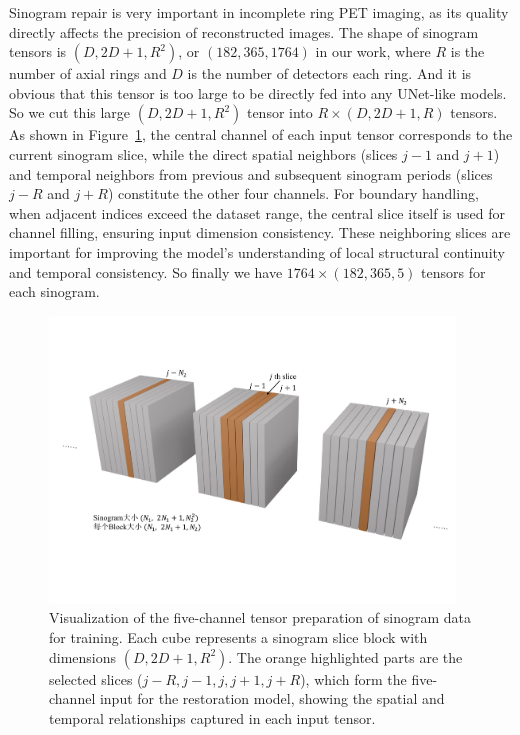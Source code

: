 \documentclass[
reprint,
superscriptaddress,
nofootinbib,
amsmath,amssymb,
aps,
prd,
]{revtex4-2}
\begin{document}
Sinogram repair is very important in incomplete ring PET imaging, as its quality directly affects the precision of reconstructed images. 
The shape of sinogram tensors is $(D, 2D+1, R^2)$, or $(182, 365, 1764)$ in our work, where $R$ is the number of axial rings and $D$ is the number of detectors each ring. And it is obvious that this tensor is too large to be directly fed into any UNet-like models. So we cut this large $(D, 2D+1, R^2)$ tensor into $R\times(D, 2D+1, R)$ tensors. 
As shown in Figure~\ref{fig:sinogram_structure}, the central channel of each input tensor corresponds to the current sinogram slice, while the direct spatial neighbors (slices $j-1$ and $j+1$) and temporal neighbors from previous and subsequent sinogram periods (slices $j-R$ and $j+R$) constitute the other four channels. For boundary handling, when adjacent indices exceed the dataset range, the central slice itself is used for channel filling, ensuring input dimension consistency. These neighboring slices are important for improving the model's understanding of local structural continuity and temporal consistency. So finally we have $1764\times(182, 365, 5)$ tensors for each sinogram.

\begin{figure}[htbp]
\centering
\vspace{-.3cm}
\includegraphics[width=0.96\textwidth]{Images/fdafads.pdf}
\vspace{-.3cm}
\caption{Visualization of the five-channel tensor preparation of sinogram data for training. Each cube represents a sinogram slice block with dimensions $(D, 2D+1, R^2)$. The orange highlighted parts are the selected slices ($j-R, j-1, j, j+1, j+R$), which form the five-channel input for the restoration model, showing the spatial and temporal relationships captured in each input tensor.}
\label{fig:sinogram_structure}
\end{figure}
\end{document}
